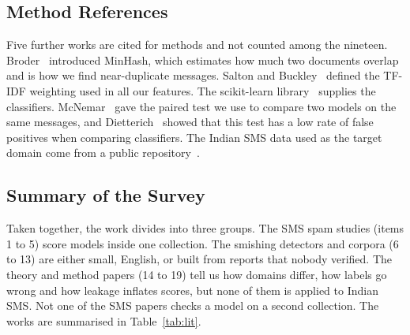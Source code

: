 \subsection{Method References}
Five further works are cited for methods and not counted among the nineteen. Broder~\cite{broder1997resemblance} introduced MinHash, which estimates how much two documents overlap and is how we find near-duplicate messages. Salton and Buckley~\cite{salton1988term} defined the TF-IDF weighting used in all our features. The scikit-learn library~\cite{pedregosa2011scikit} supplies the classifiers. McNemar~\cite{mcnemar1947note} gave the paired test we use to compare two models on the same messages, and Dietterich~\cite{dietterich1998approximate} showed that this test has a low rate of false positives when comparing classifiers. The Indian SMS data used as the target domain come from a public repository~\cite{indiasms2024}.

\subsection{Summary of the Survey}
Taken together, the work divides into three groups. The SMS spam studies (items 1 to 5) score models inside one collection. The smishing detectors and corpora (6 to 13) are either small, English, or built from reports that nobody verified. The theory and method papers (14 to 19) tell us how domains differ, how labels go wrong and how leakage inflates scores, but none of them is applied to Indian SMS. Not one of the SMS papers checks a model on a second collection. The works are summarised in Table~\ref{tab:lit}.

